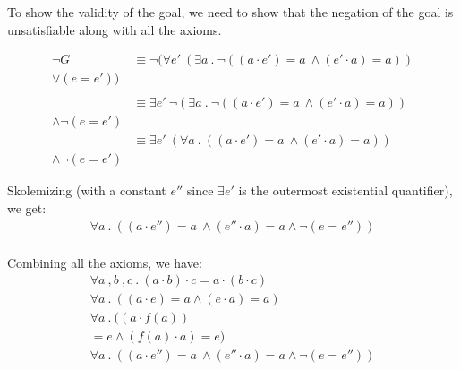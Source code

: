 \documentclass[12pt,letterpaper, onecolumn]{exam}
\begin{document}
\begin{questions}
	To show the validity of the goal, we need to show that the negation of the goal is unsatisfiable along with all the axioms.

	\begin{align*}
		\neg G &\equiv \neg (\forall e' \: (\exists a \:.\: \neg((a \cdot e') = a \: \land (e' \cdot a) = a))  \\ \lor (e = e'))  \\ \\
		&\equiv \exists e' \: \neg (\exists a \:.\: \neg((a \cdot e') = a \: \land (e' \cdot a) = a))  \\ \land \neg (e = e') \\
		&\equiv \exists e' \: (\forall a \:.\: ((a \cdot e') = a \: \land (e' \cdot a) = a))  \\ \land \neg (e = e')
	\end{align*}

	Skolemizing (with a constant $ e'' $ since $\exists e'$ is the outermost existential quantifier), we get:
	\begin{align*}
		\forall a \:.\: ((a \cdot e'') = a \: \land (e'' \cdot a) = a \land \neg (e = e''))  \\
	\end{align*}

	Combining all the axioms, we have:
	\begin{align*}
		\forall a \:, b \:, c \:.\: (a \cdot b) \cdot c = a \cdot (b \cdot c) \\
		\forall a \:.\: ((a \cdot e) = a \land (e \cdot a) = a) \\
		\forall a \:.\: ((a \cdot f(a))  \\ = e \land (f(a) \cdot a) = e) \\
		\forall a \:.\: ((a \cdot e'') = a \: \land (e'' \cdot a) = a \land \neg (e = e''))  \\
	\end{align*}


\end{questions}
\end{document}

